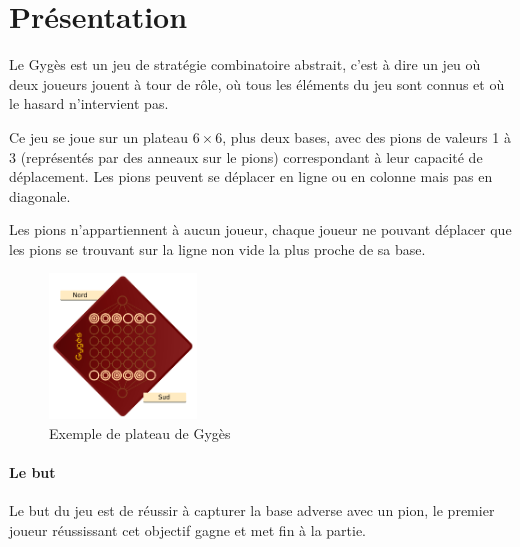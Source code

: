 \section{Présentation}

	Le Gygès est un jeu de stratégie combinatoire abstrait, c'est à dire un jeu
	où deux joueurs jouent à tour de rôle, où tous les éléments du jeu sont connus et où le hasard n'intervient
	pas.

	\vspace{1em}
	Ce jeu se joue sur un plateau $6\times{}6$, plus deux bases, avec des pions de valeurs 1 à 3 (représentés par
	des anneaux sur le pions) correspondant à leur capacité de déplacement. Les pions peuvent se déplacer en ligne
	ou en colonne mais pas en diagonale.

	\vspace{1em}
	Les pions n'appartiennent à aucun joueur, chaque joueur ne pouvant
	déplacer que les pions se trouvant sur la ligne non vide la plus proche de sa base.

	\begin{figure}[h]
		\centering
		\includegraphics[width=0.35\textwidth]{images/Gyges.png}
		\caption{Exemple de plateau de Gygès}
		\label{fig:plateau_de_gyges}
	\end{figure}

	\paragraph{Le but} Le but du jeu est de réussir à capturer la base adverse avec un pion,
	le premier joueur réussissant cet objectif gagne et met fin à la partie.

